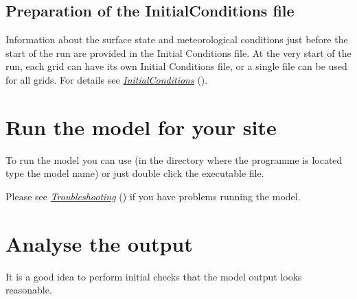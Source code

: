 \documentclass[letterpaper,10pt,english]{sphinxmanual}
\begin{document}
\subsection{Preparation of the InitialConditions file}
\label{\detokenize{prepare-to-run-the-model:preparation-of-the-initialconditions-file}}
Information about the surface state and meteorological conditions just
before the start of the run are provided in the Initial Conditions file.
At the very start of the run, each grid can have its own Initial
Conditions file, or a single file can be used for all grids. For details
see {\hyperref[\detokenize{prepare-to-run-the-model:InitialConditions}]{\emph{InitialConditions}}} ().


\section{Run the model for your site}
\label{\detokenize{prepare-to-run-the-model:run-the-model-for-your-site}}
To run the model you can use  (in the directory where
the programme is located type the model name) or just double click the
executable file.

Please see {\hyperref[\detokenize{prepare-to-run-the-model:Troubleshooting}]{\emph{Troubleshooting}}} () if you have problems
running the model.


\section{Analyse the output}
\label{\detokenize{prepare-to-run-the-model:analyse-the-output}}
It is a good idea to perform initial checks that the model output looks
reasonable.
\end{document}

